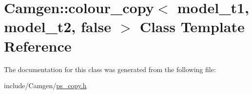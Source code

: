 \hypertarget{a00072}{\section{Camgen\-:\-:colour\-\_\-copy$<$ model\-\_\-t1, model\-\_\-t2, false $>$ Class Template Reference}
\label{a00072}
}


The documentation for this class was generated from the following file\-:\begin{DoxyCompactItemize}
\item 
include/\-Camgen/\hyperlink{a00712}{ps\-\_\-copy.\-h}\end{DoxyCompactItemize}

